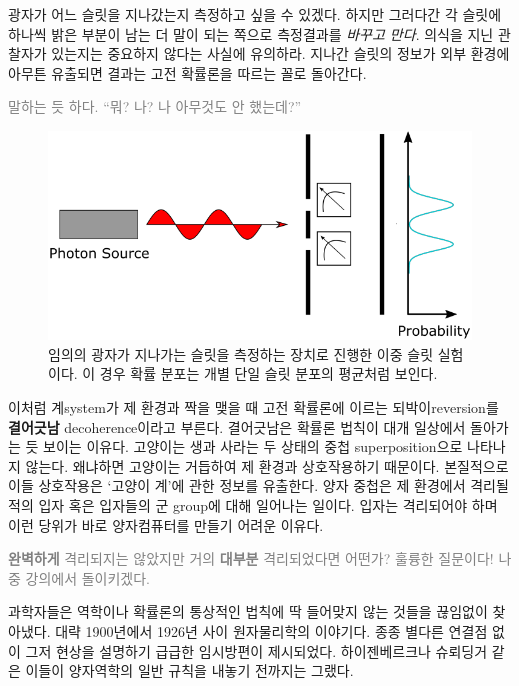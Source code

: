 \documentclass[a4paper,chapter,atbegshi,hidelinks]{oblivoir}
\begin{document}
\newpage

광자가 어느 슬릿을 지나갔는지 측정하고 싶을 수 있겠다. 하지만 그러다간 각 슬릿에
하나씩 밝은 부분이 남는 더 말이 되는 쪽으로 측정결과를 \emph{바꾸고 만다}. 
의식을 지닌 관찰자가 있는지는 중요하지 않다는 사실에 유의하라. 지나간 슬릿의
정보가 외부 환경에 아무튼 유출되면 결과는 고전 확률론을 따르는 꼴로 돌아간다. 

\hfill

\hfill\parbox[t]{9cm}{\textcolor{gray}{ 말하는 듯 하다. ``뭐? 나? 나 아무것도 안 했는데?''}}

\hfill

\begin{figure}[h]
  \centering
  \includegraphics[width=.8\textwidth]{iqis1_007}
  \caption{\label{fig:figure24}임의의 광자가 지나가는 슬릿을 측정하는 장치로
    진행한 이중 슬릿 실험이다. 이 경우 확률 분포는 개별 단일 슬릿 분포의 평균처럼
  보인다.}
\end{figure}

이처럼 계{\footnotesize system}가 제 환경과 짝을 맺을 때 고전 확률론에 이르는
되박이{\footnotesize reversion}를 \textbf{결어긋남}{\footnotesize
decoherence}이라고 부른다. 결어긋남은 확률론 법칙이 대개 일상에서 돌아가는 듯
보이는 이유다. 고양이는 생과 사라는 두 상태의 중첩{\footnotesize
superposition}으로 나타나지 않는다. 왜냐하면 고양이는 거듭하여 제 환경과
상호작용하기 때문이다. 본질적으로 이들 상호작용은 `고양이 계'에 관한 정보를
유출한다. 양자 중첩은 제 환경에서 격리될 적의 입자 혹은 입자들의 군{\footnotesize
group}에 대해 일어나는 일이다. 입자는 격리되어야 하며 이런 당위가 바로
양자컴퓨터를 만들기 어려운 이유다.

\hfill

\hfill\parbox[t]{9cm}{\textcolor{gray}{ \textbf{완벽하게}
격리되지는 않았지만 거의 \textbf{대부분} 격리되었다면 어떤가? 훌륭한 질문이다!
나중 강의에서 돌이키겠다.}}

\hfill\break

과학자들은 역학이나 확률론의 통상적인 법칙에 딱 들어맞지 않는 것들을 끊임없이
찾아냈다. 대략 1900년에서 1926년 사이 원자물리학의 이야기다. 종종 별다른 연결점
없이 그저 현상을 설명하기 급급한 임시방편이 제시되었다. 하이젠베르크나 슈뢰딩거
같은 이들이 양자역학의 일반 규칙을 내놓기 전까지는 그랬다. 
\end{document}
